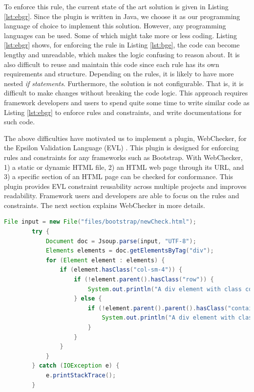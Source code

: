 \documentclass[conference]{IEEETran}
\begin{document}
To enforce this rule, the current state of the art solution is given in Listing \ref{lst:ebgr}. Since the plugin is written in Java, we choose it as our programming language of choice to implement this solution. However, any programming languages can be used. Some of which might take more or less coding. Listing \ref{lst:ebgr} shows, for enforcing the rule in Listing \ref{lst:bge}, the code can become lengthy and unreadable, which makes the logic confusing to reason about. It is also difficult to reuse and maintain this code since each rule has its own requirements and structure. Depending on the rules, it is likely to have more nested \textit{if statements}. Furthermore, the solution is not configurable. That is, it is difficult to make changes without breaking the code logic. This approach requires framework developers and users to spend quite some time to write similar code as Listing \ref{lst:ebgr} to enforce rules and constraints, and write documentations for such code.   

The above difficulties have motivated us to implement a plugin, WebChecker, for the Epsilon Validation Language (EVL) \cite{Kolovos2009}.  This plugin is designed for enforcing rules and constraints for any frameworks such as Bootstrap. With WebChecker, 1) a static or dynamic HTML file, 2) an HTML web page through its URL, and 3) a specific section of an HTML page can be checked for conformance. This plugin provides EVL constraint reusability across multiple projects and improves readability. Framework users and developers are able to focus on the rules and constraints. The next section explains WebChecker in more details.    

\begin{lstlisting}[language=Java, caption=Enforcing Bootstrap Grid Rule, label={lst:ebgr}]
		File input = new File("files/bootstrap/newCheck.html");
		try {
			Document doc = Jsoup.parse(input, "UTF-8");
			Elements elements = doc.getElementsByTag("div");
			for (Element element : elements) {
				if (element.hasClass("col-sm-4")) {					
					if (!element.parent().hasClass("row")) {
						System.out.println("A div element with class col should have a parent element with class row");
					} else {
						if (!element.parent().parent().hasClass("container")) {
							System.out.println("A div element with class col should have a parent element with class row, which has a parent with class container.");
						}
					}
				}
			}		
		} catch (IOException e) {
			e.printStackTrace();
		}
\end{lstlisting}
\end{document}
